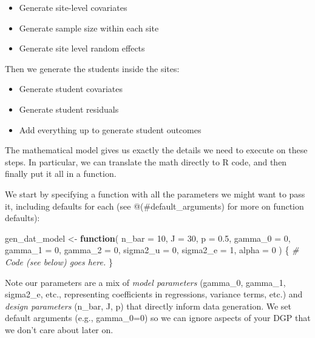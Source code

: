 \documentclass[
]{book}
\newenvironment{Shaded}{\begin{snugshade}}{\end{snugshade}}
\newcommand{\AttributeTok}[1]{\textcolor[rgb]{0.77,0.63,0.00}{#1}}
\newcommand{\CommentTok}[1]{\textcolor[rgb]{0.56,0.35,0.01}{\textit{#1}}}
\newcommand{\ControlFlowTok}[1]{\textcolor[rgb]{0.13,0.29,0.53}{\textbf{#1}}}
\newcommand{\DecValTok}[1]{\textcolor[rgb]{0.00,0.00,0.81}{#1}}
\newcommand{\FloatTok}[1]{\textcolor[rgb]{0.00,0.00,0.81}{#1}}
\newcommand{\NormalTok}[1]{#1}
\newcommand{\OtherTok}[1]{\textcolor[rgb]{0.56,0.35,0.01}{#1}}
\providecommand{\tightlist}{%
  \setlength{\itemsep}{0pt}\setlength{\parskip}{0pt}}
\begin{document}
\begin{itemize}
\tightlist
\item
  Generate site-level covariates
\item
  Generate sample size within each site
\item
  Generate site level random effects
\end{itemize}

Then we generate the students inside the sites:

\begin{itemize}
\tightlist
\item
  Generate student covariates
\item
  Generate student residuals
\item
  Add everything up to generate student outcomes
\end{itemize}

The mathematical model gives us exactly the details we need to execute on these steps.
In particular, we can translate the math directly to R code, and then finally put it all in a function.

We start by specifying a function with all the parameters we might want to pass it, including defaults for each (see @(\#default\_arguments) for more on function defaults):

\begin{Shaded}
\begin{Highlighting}[]
\NormalTok{gen\_dat\_model }\OtherTok{\textless{}{-}} \ControlFlowTok{function}\NormalTok{( }\AttributeTok{n\_bar =} \DecValTok{10}\NormalTok{,}
                           \AttributeTok{J =} \DecValTok{30}\NormalTok{,}
                           \AttributeTok{p =} \FloatTok{0.5}\NormalTok{,}
                           \AttributeTok{gamma\_0 =} \DecValTok{0}\NormalTok{, }\AttributeTok{gamma\_1 =} \DecValTok{0}\NormalTok{, }\AttributeTok{gamma\_2 =} \DecValTok{0}\NormalTok{,}
                           \AttributeTok{sigma2\_u =} \DecValTok{0}\NormalTok{, }\AttributeTok{sigma2\_e =} \DecValTok{1}\NormalTok{,}
                           \AttributeTok{alpha =} \DecValTok{0}\NormalTok{ ) \{}
  \CommentTok{\# Code (see below) goes here.}
\NormalTok{\}}
\end{Highlighting}
\end{Shaded}

Note our parameters are a mix of \emph{model parameters} (gamma\_0, gamma\_1, sigma2\_e, etc., representing coefficients in regressions, variance terms, etc.) and \emph{design parameters} (n\_bar, J, p) that directly inform data generation.
We set default arguments (e.g., gamma\_0=0) so we can ignore aspects of your DGP that we don't care about later on.
\end{document}

